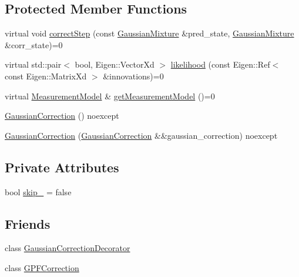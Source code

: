 \subsection*{Protected Member Functions}
\begin{DoxyCompactItemize}
\item 
virtual void \mbox{\hyperlink{classbfl_1_1GaussianCorrection_af30322d949e8135e1ec243bd6df00c18}{correct\+Step}} (const \mbox{\hyperlink{classbfl_1_1GaussianMixture}{Gaussian\+Mixture}} \&pred\+\_\+state, \mbox{\hyperlink{classbfl_1_1GaussianMixture}{Gaussian\+Mixture}} \&corr\+\_\+state)=0
\item 
virtual std\+::pair$<$ bool, Eigen\+::\+Vector\+Xd $>$ \mbox{\hyperlink{classbfl_1_1GaussianCorrection_a08e227b697ffbaf97c85fb4b17c99fd4}{likelihood}} (const Eigen\+::\+Ref$<$ const Eigen\+::\+Matrix\+Xd $>$ \&innovations)=0
\item 
virtual \mbox{\hyperlink{classbfl_1_1MeasurementModel}{Measurement\+Model}} \& \mbox{\hyperlink{classbfl_1_1GaussianCorrection_af609a22d84cc17a7337486c339ef30c3}{get\+Measurement\+Model}} ()=0
\item 
\mbox{\hyperlink{classbfl_1_1GaussianCorrection_a0ec06180aaf28ccaea798470a83b5f57}{Gaussian\+Correction}} () noexcept
\item 
\mbox{\hyperlink{classbfl_1_1GaussianCorrection_af901442309ecdc64607ab256aabc78a7}{Gaussian\+Correction}} (\mbox{\hyperlink{classbfl_1_1GaussianCorrection}{Gaussian\+Correction}} \&\&gaussian\+\_\+correction) noexcept
\end{DoxyCompactItemize}
\subsection*{Private Attributes}
\begin{DoxyCompactItemize}
\item 
bool \mbox{\hyperlink{classbfl_1_1GaussianCorrection_a6941174f7c3e3bb380e89bb6b4429f5e}{skip\+\_\+}} = false
\end{DoxyCompactItemize}
\subsection*{Friends}
\begin{DoxyCompactItemize}
\item 
class \mbox{\hyperlink{classbfl_1_1GaussianCorrection_a78bd8d7a082c77910c4ce95135781e2c}{Gaussian\+Correction\+Decorator}}
\item 
class \mbox{\hyperlink{classbfl_1_1GaussianCorrection_a5bc4f3f9c22a163bbcaac8d54f37a355}{G\+P\+F\+Correction}}
\end{DoxyCompactItemize}



